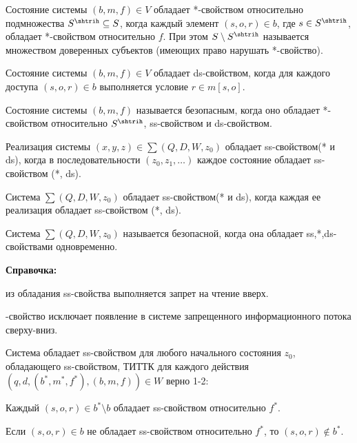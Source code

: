 \begin{defs}
	Состояние системы $(b,m,f) \in V$ обладает *-свойством относительно подмножества $S^{\shtrih} \subseteq S$, когда каждый элемент $(s,o,r) \in b$, где $s \in S^{\shtrih}$, обладает *-свойством относительно $f$.
	При этом $S \setminus S^{\shtrih}$ называется множеством доверенных субъектов (имеющих право нарушать *-свойство).
\end{defs}

\begin{defs}
	Состояние системы $(b,m,f) \in V$ обладает ds-свойством, когда для каждого доступа $(s,o,r) \in b$ выполняется условие $r \in m[s,o]$.
\end{defs}

\begin{defs}
	Состояние системы $(b,m,f)$ называется безопасным, когда оно обладает *-свойством относительно $S^{\shtrih}$, ss-свойством и ds-свойством.
\end{defs}

\begin{defs}
	Реализация системы $(x,y,z) \in \sum (Q,D,W,z_0)$ обладает ss-свойством(* и ds), когда в последовательности $(z_0, z_1, \ldots)$ каждое состояние обладает ss-свойством (*, ds).
\end{defs}

\begin{defs}
	Система $\sum (Q,D,W,z_0)$ обладает ss-свойством(* и ds), когда каждая ее реализация обладает ss-свойством (*, ds).
\end{defs}

\begin{defs}
	Система $\sum (Q,D,W,z_0)$ называется безопасной, когда она обладает ss,*,ds-свойствами одновременно.
\end{defs}

\textbf{Справочка:}
	\begin{itemize*}
		\item из обладания ss-свойства выполняется запрет на чтение вверх.
		\item *-свойство исключает появление в системе запрещенного информационного потока сверху-вниз.
	\end{itemize*}

\begin{proofs}[А1]
	Система обладает ss-свойством для любого начального состояния $z_0$, обладающего ss-свойством, ТИТТК для каждого действия $(q,d,(b^*,m^*,f^*), (b,m,f)) \in W$ верно 1-2:
	\begin{enumerate*}
		\item Каждый $(s,o,r) \in b^* \setminus b$ обладает ss-свойством относительно $f^*$.
		\item Если $(s,o,r) \in b$ не обладает ss-свойством относительно $f^*$, то $(s,o,r) \notin b^*$.
	\end{enumerate*}
\end{proofs}

